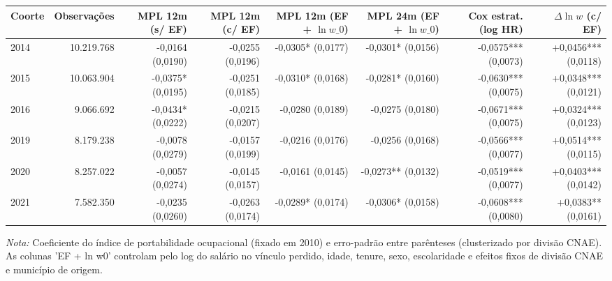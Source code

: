\providecommand{\toprule}{\hline\hline}
\providecommand{\midrule}{\hline}
\providecommand{\bottomrule}{\hline\hline}
\providecommand{\addlinespace}[1][]{}
{\small
\renewcommand{\arraystretch}{1.12}
\begin{tabular}{lrrrrrrr}
\toprule
Coorte & Observações & MPL 12m (s/ EF) & MPL 12m (c/ EF) & MPL 12m (EF + $\ln w\_0$) & MPL 24m (EF + $\ln w\_0$) & Cox estrat. (log HR) & $\Delta\ln w$ (c/ EF) \\
\midrule
2014 & 10.219.768 & -0,0164 (0,0190) & -0,0255 (0,0196) & -0,0305* (0,0177) & -0,0301* (0,0156) & -0,0575*** (0,0073) & +0,0456*** (0,0118) \\
2015 & 10.063.904 & -0,0375* (0,0195) & -0,0251 (0,0185) & -0,0310* (0,0168) & -0,0281* (0,0160) & -0,0630*** (0,0075) & +0,0348*** (0,0121) \\
2016 & 9.066.692 & -0,0434* (0,0222) & -0,0215 (0,0207) & -0,0280 (0,0189) & -0,0275 (0,0180) & -0,0671*** (0,0075) & +0,0324*** (0,0123) \\
2019 & 8.179.238 & -0,0078 (0,0279) & -0,0157 (0,0199) & -0,0216 (0,0176) & -0,0256 (0,0168) & -0,0566*** (0,0077) & +0,0514*** (0,0115) \\
2020 & 8.257.022 & -0,0057 (0,0274) & -0,0145 (0,0157) & -0,0161 (0,0145) & -0,0273** (0,0132) & -0,0519*** (0,0077) & +0,0403*** (0,0142) \\
2021 & 7.582.350 & -0,0235 (0,0260) & -0,0263 (0,0174) & -0,0289* (0,0174) & -0,0306* (0,0158) & -0,0608*** (0,0080) & +0,0383** (0,0161) \\
\bottomrule
\end{tabular}
\vspace{2pt}
\par{\footnotesize \textit{Nota:} Coeficiente do índice de portabilidade ocupacional (fixado em 2010) e erro-padrão entre parênteses (clusterizado por divisão CNAE). As colunas 'EF + ln w0' controlam pelo log do salário no vínculo perdido, idade, tenure, sexo, escolaridade e efeitos fixos de divisão CNAE e município de origem.}
}
